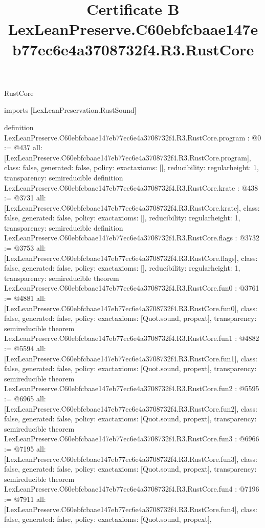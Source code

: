 \begin{lexlean}{RustCore}
\title{Certificate B LexLeanPreserve.C60ebfcbaae147eb77ec6e4a3708732f4.R3.RustCore}
\begin{coremodule}
imports [LexLeanPreservation.RustSound]

definition LexLeanPreserve.C60ebfcbaae147eb77ec6e4a3708732f4.R3.RustCore.program : @0 := @437 {
  all: [LexLeanPreserve.C60ebfcbaae147eb77ec6e4a3708732f4.R3.RustCore.program],
  class: false,
  generated: false,
  policy: exact{axioms: []},
  reducibility: regular{height: 1},
  transparency: semireducible
}
definition LexLeanPreserve.C60ebfcbaae147eb77ec6e4a3708732f4.R3.RustCore.krate : @438 := @3731 {
  all: [LexLeanPreserve.C60ebfcbaae147eb77ec6e4a3708732f4.R3.RustCore.krate],
  class: false,
  generated: false,
  policy: exact{axioms: []},
  reducibility: regular{height: 1},
  transparency: semireducible
}
definition LexLeanPreserve.C60ebfcbaae147eb77ec6e4a3708732f4.R3.RustCore.flags : @3732 := @3753 {
  all: [LexLeanPreserve.C60ebfcbaae147eb77ec6e4a3708732f4.R3.RustCore.flags],
  class: false,
  generated: false,
  policy: exact{axioms: []},
  reducibility: regular{height: 1},
  transparency: semireducible
}
theorem LexLeanPreserve.C60ebfcbaae147eb77ec6e4a3708732f4.R3.RustCore.fun0 : @3761 := @4881 {
  all: [LexLeanPreserve.C60ebfcbaae147eb77ec6e4a3708732f4.R3.RustCore.fun0],
  class: false,
  generated: false,
  policy: exact{axioms: [Quot.sound, propext]},
  transparency: semireducible
}
theorem LexLeanPreserve.C60ebfcbaae147eb77ec6e4a3708732f4.R3.RustCore.fun1 : @4882 := @5594 {
  all: [LexLeanPreserve.C60ebfcbaae147eb77ec6e4a3708732f4.R3.RustCore.fun1],
  class: false,
  generated: false,
  policy: exact{axioms: [Quot.sound, propext]},
  transparency: semireducible
}
theorem LexLeanPreserve.C60ebfcbaae147eb77ec6e4a3708732f4.R3.RustCore.fun2 : @5595 := @6965 {
  all: [LexLeanPreserve.C60ebfcbaae147eb77ec6e4a3708732f4.R3.RustCore.fun2],
  class: false,
  generated: false,
  policy: exact{axioms: [Quot.sound, propext]},
  transparency: semireducible
}
theorem LexLeanPreserve.C60ebfcbaae147eb77ec6e4a3708732f4.R3.RustCore.fun3 : @6966 := @7195 {
  all: [LexLeanPreserve.C60ebfcbaae147eb77ec6e4a3708732f4.R3.RustCore.fun3],
  class: false,
  generated: false,
  policy: exact{axioms: [Quot.sound, propext]},
  transparency: semireducible
}
theorem LexLeanPreserve.C60ebfcbaae147eb77ec6e4a3708732f4.R3.RustCore.fun4 : @7196 := @7911 {
  all: [LexLeanPreserve.C60ebfcbaae147eb77ec6e4a3708732f4.R3.RustCore.fun4],
  class: false,
  generated: false,
  policy: exact{axioms: [Quot.sound, propext]},
}
\end{coremodule}
\end{lexlean}
